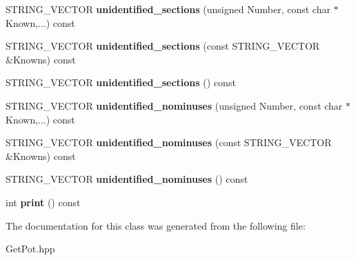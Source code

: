 \begin{DoxyCompactItemize}
\item 
\hypertarget{classGetPot_ada04daaaee674288521f6532ed3fbcf0}{
STRING\_\-VECTOR {\bfseries unidentified\_\-sections} (unsigned Number, const char $\ast$Known,...) const }
\label{classGetPot_ada04daaaee674288521f6532ed3fbcf0}

\item 
\hypertarget{classGetPot_a5e716f5a2db7bd7cf9ac43c1d02e16ab}{
STRING\_\-VECTOR {\bfseries unidentified\_\-sections} (const STRING\_\-VECTOR \&Knowns) const }
\label{classGetPot_a5e716f5a2db7bd7cf9ac43c1d02e16ab}

\item 
\hypertarget{classGetPot_ae54ef4d5f10fa3b5badf39e5dcda529b}{
STRING\_\-VECTOR {\bfseries unidentified\_\-sections} () const }
\label{classGetPot_ae54ef4d5f10fa3b5badf39e5dcda529b}

\item 
\hypertarget{classGetPot_a9378d42c51fe2fa8f2388c2c47744080}{
STRING\_\-VECTOR {\bfseries unidentified\_\-nominuses} (unsigned Number, const char $\ast$Known,...) const }
\label{classGetPot_a9378d42c51fe2fa8f2388c2c47744080}

\item 
\hypertarget{classGetPot_a72f3552844a9fd451cc981ca212bd74c}{
STRING\_\-VECTOR {\bfseries unidentified\_\-nominuses} (const STRING\_\-VECTOR \&Knowns) const }
\label{classGetPot_a72f3552844a9fd451cc981ca212bd74c}

\item 
\hypertarget{classGetPot_a11086beb1e3d595140617838ae16a53e}{
STRING\_\-VECTOR {\bfseries unidentified\_\-nominuses} () const }
\label{classGetPot_a11086beb1e3d595140617838ae16a53e}

\item 
\hypertarget{classGetPot_a50eb9af9aec818bf434da399bb3644d1}{
int {\bfseries print} () const }
\label{classGetPot_a50eb9af9aec818bf434da399bb3644d1}

\end{DoxyCompactItemize}


The documentation for this class was generated from the following file:\begin{DoxyCompactItemize}
\item 
GetPot.hpp\end{DoxyCompactItemize}
